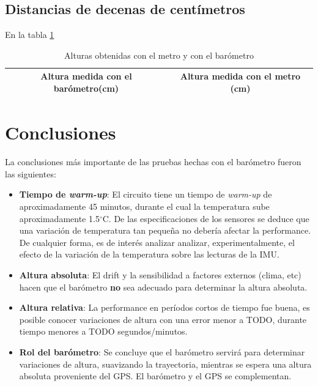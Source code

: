 \documentclass[spanish,12pt,a4paper,titlepage]{report}
\newcommand{\degc}{$^\circ$C}
\begin{document}
\subsection{Distancias de decenas de centímetros}

En la tabla \ref{tab:alturascm}


\begin{table}[H]
\centering
\begin{tabular}{|c|c|} 

	\cellcolor[gray]{0.8} {Altura medida con el barómetro(cm)} &
	\cellcolor[gray]{0.8} Altura medida con el metro (cm) \\ \hline
\end{tabular}
\caption{Alturas obtenidas con el metro y con el barómetro}
\label{tab:alturascm}
\end{table}


\newpage
\section{Conclusiones}
\label{sec:conclusiones}

La conclusiones más importante de las pruebas hechas con el barómetro fueron las siguientes:

\begin{itemize}
\item \textbf{Tiempo de \textit{warm-up}}: El circuito tiene un tiempo de \textit{warm-up} de aproximadamente 45 minutos, durante el cual la temperatura sube aproximadamente 1.5\degc. De las especificaciones de los sensores se deduce que una variación de temperatura tan pequeña no debería afectar la performance. De cualquier forma, es de interés analizar analizar, experimentalmente, el efecto de la variación de la temperatura sobre las lecturas de la IMU.
\item \textbf{Altura absoluta}: El drift y la sensibilidad a factores externos (clima, etc) hacen que el barómetro \textbf{no} sea adecuado para determinar la altura absoluta.
\item \textbf{Altura relativa}: La performance en períodos cortos de tiempo fue buena, es posible conocer variaciones de altura con una error menor a TODO, durante tiempo menores a TODO segundos/minutos.
\item \textbf{Rol del barómetro}: Se concluye que el barómetro servirá para determinar variaciones de altura, suavizando la trayectoria, mientras se espera una altura absoluta proveniente del GPS. El barómetro y el GPS se complementan.
\end{itemize}
\end{document}
